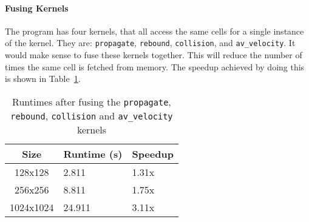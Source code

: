 


\paragraph{Fusing Kernels}
The program has four kernels, that all access the same cells for a single instance of the kernel. They are: \texttt{propagate}, \texttt{rebound}, \texttt{collision}, and \texttt{av\_velocity}.  It would make sense to fuse these kernels together. This will reduce the number of times the same cell is fetched from memory. The speedup achieved by doing this is shown in Table~\ref{table:fusing-kernels}.

\begin{table}[ht]
\vspace{-3mm}
\centering
\caption{Runtimes after fusing the \texttt{propagate}, \texttt{rebound}, \texttt{collision} and \texttt{av\_velocity} kernels}
\vspace{1mm}
\begin{tabular}{|c||p{5.8em}|p{4.8em}|}
    \hline
    Size & Runtime (s) & Speedup \\
    \hline
    128x128 & 2.811 & 1.31x \\
    \hline
    256x256 & 8.811 & 1.75x \\
    \hline
    1024x1024 & 24.911 & 3.11x \\
    \hline
\end{tabular}
\label{table:fusing-kernels}
\vspace{-5mm}
\end{table}
